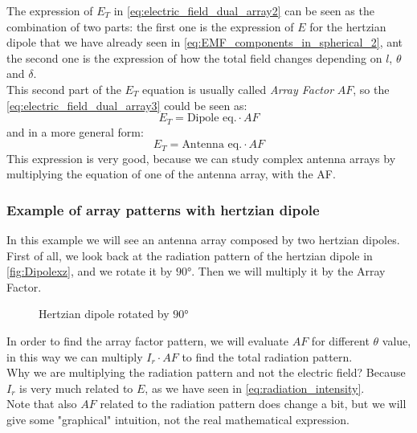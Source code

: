 The expression of $E_T$ in \cref{eq:electric_field_dual_array2} can be seen as the combination of two parts: the first one is the expression of $E$ for the hertzian dipole that we have already seen in \cref{eq:EMF_components_in_spherical_2}, ant the second one is the expression of how the total field changes depending on $l$, $\theta$ and $\delta$.\\
This second part of the $E_T$ equation is usually called \emph{Array Factor} $AF$, so the \cref{eq:electric_field_dual_array3} could be seen as:
\begin{equation}
    E_T=\text{Dipole eq.} \cdot AF
\end{equation}
and in a more general form:
\begin{equation}
    E_T=\text{Antenna eq.} \cdot AF
\end{equation}
This expression is very good, because we can study complex antenna arrays by multiplying the equation of one of the antenna array, with the AF.
\subsubsection*{Example of array patterns with hertzian dipole}
In this example we will see an antenna array composed by two hertzian dipoles.\\
First of all, we look back at the radiation pattern of the hertzian dipole in \cref{fig:Dipolexz}, and we rotate it by $90\si{\degree}$. Then we will multiply it by the Array Factor.
\begin{figure}[H]
    \begin{center}
        \caption{Hertzian dipole rotated by $90\si{\degree}$}\label{fig:Dipolexyrotated}
    \end{center}
\end{figure}
In order to find the array factor pattern, we will evaluate $AF$ for different $\theta$ value, in this way we can multiply $I_r\cdot AF$ to find the total radiation pattern.\\
Why we are multiplying the radiation pattern and not the electric field? Because $I_r$ is very much related to $E$, as we have seen in \cref{eq:radiation_intensity}.\\
Note that also $AF$ related to the radiation pattern does change a bit, but we will give some "graphical" intuition, not the real mathematical expression.

